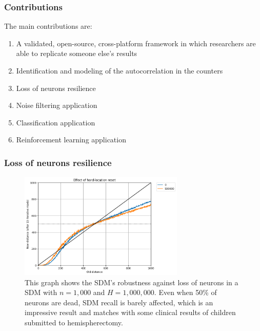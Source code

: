 \documentclass{beamer}
\begin{document}
\begin{frame}
\frametitle{Contributions}

The main contributions are:
\begin{enumerate}[i]
\item A validated, open-source, cross-platform framework in which researchers are able to replicate someone else's results
\item Identification and modeling of the autocorrelation in the counters
\item Loss of neurons resilience
\item Noise filtering application
\item Classification application
\item Reinforcement learning application
\end{enumerate}
\end{frame}


\begin{frame}
\frametitle{Loss of neurons resilience}
\begin{figure}
\centering\includegraphics[width=0.7\textwidth]{./images02/new-images/sdm-neuron-death-500k.png}
\caption{This graph shows the SDM's robustness against loss of neurons in a SDM with $n=1,000$ and $H=1,000,000$. Even when 50\% of neurons are dead, SDM recall is barely affected, which is an impressive result and matches with some clinical results of children submitted to hemispherectomy.
\label{fig:sdm-neuron-death-500k}}
\end{figure}
\end{frame}
\end{document}
